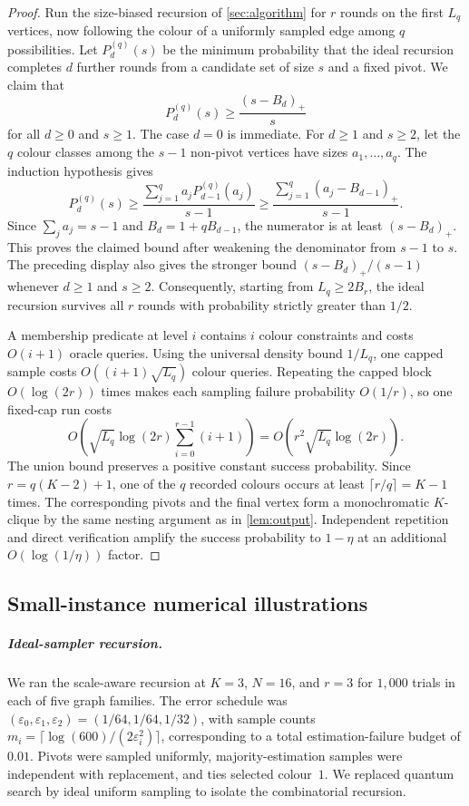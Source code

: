 \begin{proof}
Run the size-biased recursion of \cref{sec:algorithm} for $r$ rounds on the
first $L_q$ vertices, now following the colour of a uniformly sampled edge
among $q$ possibilities.  Let $P_d^{(q)}(s)$ be the minimum probability that
the ideal recursion completes $d$ further rounds from a candidate set of size
$s$ and a fixed pivot.  We claim that
\[
 P_d^{(q)}(s)\ge \frac{(s-B_d)_+}{s}
\]
for all $d\ge0$ and $s\ge1$.  The case $d=0$ is immediate.  For $d\ge1$ and
$s\ge2$, let the $q$ colour classes among the $s-1$ non-pivot vertices have
sizes $a_1,\ldots,a_q$.  The induction hypothesis gives
\[
 P_d^{(q)}(s)
 \ge \frac{\sum_{j=1}^q a_jP_{d-1}^{(q)}(a_j)}{s-1}
 \ge \frac{\sum_{j=1}^q(a_j-B_{d-1})_+}{s-1}.
\]
Since $\sum_j a_j=s-1$ and $B_d=1+qB_{d-1}$, the numerator is at least
$(s-B_d)_+$.  This proves the claimed bound after weakening the denominator
from $s-1$ to $s$.  The preceding display also gives the stronger bound
$(s-B_d)_+/(s-1)$ whenever $d\ge1$ and $s\ge2$.  Consequently, starting from
$L_q\ge2B_r$, the ideal recursion survives all $r$ rounds with probability
strictly greater than $1/2$.

A membership predicate at level $i$ contains $i$ colour constraints and costs
$O(i+1)$ oracle queries.  Using the universal density bound $1/L_q$, one
capped sample costs $O((i+1)\sqrt{L_q})$ colour queries.  Repeating the capped
block $O(\log(2r))$ times makes each sampling failure probability
$O(1/r)$, so one fixed-cap run costs
\[
 O\!\left(
 \sqrt{L_q}\log(2r)\sum_{i=0}^{r-1}(i+1)
 \right)
 =O\!\left(r^2\sqrt{L_q}\log(2r)\right).
\]
The union bound preserves a positive constant success probability.  Since
$r=q(K-2)+1$, one of the $q$ recorded colours occurs at least
$\lceil r/q\rceil=K-1$ times.  The corresponding pivots and the final vertex
form a monochromatic $K$-clique by the same nesting argument as in
\cref{lem:output}.  Independent repetition and direct verification amplify
the success probability to $1-\eta$ at an additional
$O(\log(1/\eta))$ factor.
\end{proof}

\subsection{Small-instance numerical illustrations}
\label{app:experiments}

\subparagraph*{Ideal-sampler recursion.}
We ran the scale-aware recursion at $K=3$, $N=16$, and $r=3$ for $1{,}000$
trials in each of five graph families.  The error schedule was
$(\varepsilon_0,\varepsilon_1,\varepsilon_2)=(1/64,1/64,1/32)$, with
sample counts
$m_i=\lceil\log(600)/(2\varepsilon_i^2)\rceil$, corresponding to a total
estimation-failure budget of $0.01$.  Pivots were sampled uniformly,
majority-estimation samples were independent with replacement, and ties
selected colour~$1$.  We replaced quantum search by ideal uniform sampling to
isolate the combinatorial recursion.

